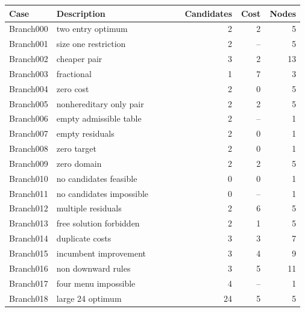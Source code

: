 \documentclass[11pt,letterpaper,oneside,openany]{book}
\theoremstyle{quiet}
\begin{document}
\begin{longtable}{@{}p{0.14\linewidth}p{0.43\linewidth}rrr@{}}

\toprule Case & Description & Candidates & Cost & Nodes\\\midrule\endhead

Branch000 & two entry optimum & 2 & 2 & 5\\

Branch001 & size one restriction & 2 & -- & 5\\

Branch002 & cheaper pair & 3 & 2 & 13\\

Branch003 & fractional & 1 & 7 & 3\\

Branch004 & zero cost & 2 & 0 & 5\\

Branch005 & nonhereditary only pair & 2 & 2 & 5\\

Branch006 & empty admissible table & 2 & -- & 1\\

Branch007 & empty residuals & 2 & 0 & 1\\

Branch008 & zero target & 2 & 0 & 1\\

Branch009 & zero domain & 2 & 2 & 5\\

Branch010 & no candidates feasible & 0 & 0 & 1\\

Branch011 & no candidates impossible & 0 & -- & 1\\

Branch012 & multiple residuals & 2 & 6 & 5\\

Branch013 & free solution forbidden & 2 & 1 & 5\\

Branch014 & duplicate costs & 3 & 3 & 7\\

Branch015 & incumbent improvement & 3 & 4 & 9\\

Branch016 & non downward rules & 3 & 5 & 11\\

Branch017 & four menu impossible & 4 & -- & 1\\

Branch018 & large 24 optimum & 24 & 5 & 5\\


\end{longtable}
\end{document}
